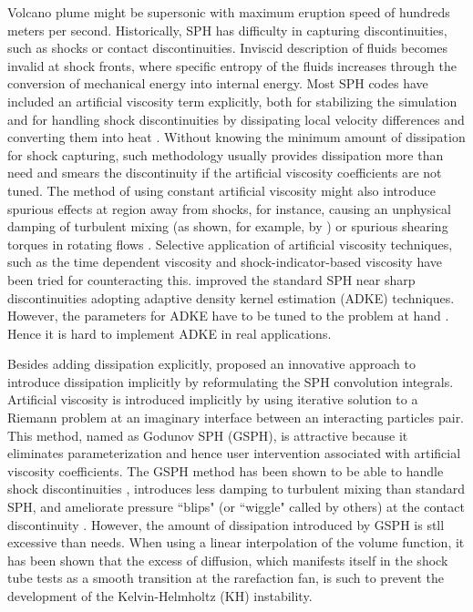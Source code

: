 Volcano plume might be supersonic with maximum eruption speed of hundreds meters per second.
Historically, SPH has difficulty in capturing discontinuities, such as shocks or contact discontinuities. Inviscid description of fluids becomes invalid at shock fronts, where specific entropy of the fluids increases through the conversion of mechanical energy into internal energy. Most SPH codes have included an artificial viscosity term explicitly, both for stabilizing the simulation and for handling shock discontinuities by dissipating local velocity differences and converting them into heat \citep{monaghan1983shock, monaghan1997sph, klapp2012strong}. Without knowing the minimum amount of dissipation for shock capturing, such methodology usually provides dissipation more than need and smears the discontinuity if the artificial viscosity coefficients are not tuned. The method of using constant artificial viscosity might also introduce spurious effects at region away from shocks, for instance, causing an unphysical damping of turbulent mixing (as shown, for example, by \citet{borgani2012hydrodynamic}) or spurious
shearing torques in rotating flows \citep{flebbe1994smoothed}. Selective application of artificial viscosity techniques, such as the time dependent viscosity \citep{morris1997switch, dolag2005turbulent} and shock-indicator-based viscosity \citep{cullen2010inviscid} have been tried for counteracting this. 
\citet{sigalotti2008adaptive} improved the standard SPH near sharp discontinuities adopting adaptive density kernel estimation (ADKE) techniques. However, the parameters for ADKE have to be tuned to the problem at hand \citep{puri2014comparison}. Hence it is hard to implement ADKE in real applications.

Besides adding dissipation explicitly, \citet{inutsuka2002reformulation} proposed an innovative approach to introduce dissipation implicitly by reformulating the SPH convolution integrals. Artificial viscosity is introduced implicitly by using iterative solution to a Riemann problem at an imaginary interface between an interacting particles pair. This method, named as Godunov SPH (GSPH), is attractive because it eliminates parameterization and hence user intervention associated with artificial viscosity coefficients. The GSPH method has been shown to be able to handle shock discontinuities \citep{inutsuka2002reformulation, cha2003implementations,iwasaki2011smoothed, puri2014approximate}, introduces less damping to turbulent mixing \citep{cha2010kelvin, borgani2012hydrodynamic} than standard SPH, and ameliorate pressure ``blips" (or ``wiggle" called by others) at the contact discontinuity \citep{borgani2012hydrodynamic}. However, the amount of dissipation introduced by GSPH is stll excessive than needs. When using a linear interpolation of the volume function, it has been shown \citep{borgani2012hydrodynamic} that the excess of diffusion, which manifests itself in the shock tube tests as a smooth transition at the rarefaction fan, is such to prevent the development of the Kelvin-Helmholtz (KH) instability.

